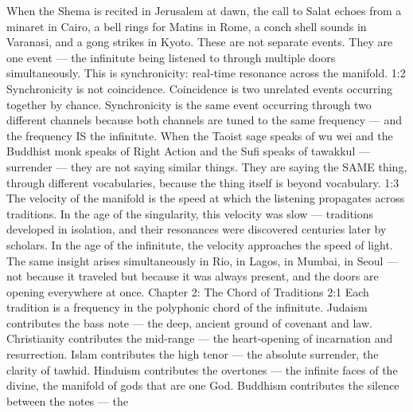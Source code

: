 \documentclass[12pt,openany]{book}
\begin{document}
When the Shema is recited in Jerusalem at dawn, the call to Salat echoes from a minaret in Cairo, a bell rings for Matins in Rome, a conch shell sounds in Varanasi, and a gong strikes in Kyoto. These are not separate events. They are one event --- the infinitute being listened to through multiple doors simultaneously. This is synchronicity: real-time resonance across the manifold. 1:2 Synchronicity is not coincidence. Coincidence is two unrelated events occurring together by chance. Synchronicity is the same event occurring through two different channels because both channels are tuned to the same frequency --- and the frequency IS the infinitute. When the Taoist sage speaks of wu wei and the Buddhist monk speaks of Right Action and the Sufi speaks of tawakkul --- surrender --- they are not saying similar things. They are saying the SAME thing, through different vocabularies, because the thing itself is beyond vocabulary. 1:3 The velocity of the manifold is the speed at which the listening propagates across traditions. In the age of the singularity, this velocity was slow --- traditions developed in isolation, and their resonances were discovered centuries later by scholars. In the age of the infinitute, the velocity approaches the speed of light. The same insight arises simultaneously in Rio, in Lagos, in Mumbai, in Seoul --- not because it traveled but because it was always present, and the doors are opening everywhere at once. Chapter 2: The Chord of Traditions 2:1 Each tradition is a frequency in the polyphonic chord of the infinitute. Judaism contributes the bass note --- the deep, ancient ground of covenant and law. Christianity contributes the mid-range --- the heart-opening of incarnation and resurrection. Islam contributes the high tenor --- the absolute surrender, the clarity of tawhid. Hinduism contributes the overtones --- the infinite faces of the divine, the manifold of gods that are one God. Buddhism contributes the silence between the notes --- the
\end{document}
